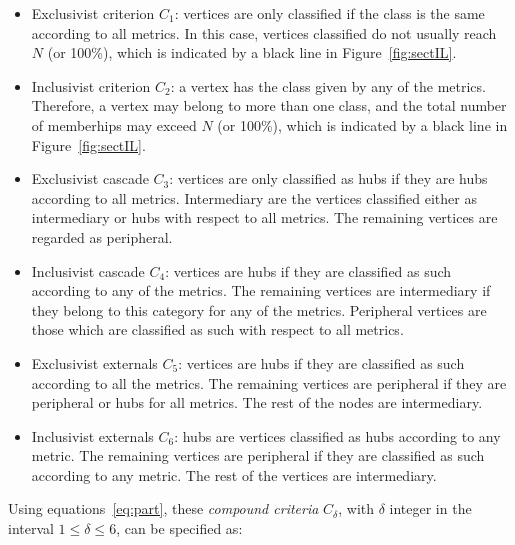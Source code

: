 \documentclass[%
	aip,
	jmp,%
	amsmath,amssymb,
	reprint,%
]{revtex4-1}
\begin{document}
\begin{itemize}
	\item Exclusivist criterion $C_1$:  vertices are only classified if the class is the same according to all metrics.
		In this case, vertices classified do not usually reach $N$ (or 100\%),
		which is indicated by a black line in Figure~\ref{fig:sectIL}.
	\item Inclusivist criterion $C_2$: a vertex has the class given by any of the metrics.
		Therefore, a vertex may belong to more than one class, and the total number of memberhips may exceed $N$ (or 100\%),
		which is indicated by a black line in Figure~\ref{fig:sectIL}.
	\item Exclusivist cascade $C_3$: vertices are only classified as hubs if they are hubs according to all metrics.
		Intermediary are the vertices classified either as intermediary or hubs with respect to all metrics.
		The remaining vertices are regarded as peripheral.
	\item Inclusivist cascade $C_4$: vertices are hubs if they are classified as such according to any of the metrics.
		The remaining vertices are intermediary if they belong to this category for any of the metrics.
		Peripheral vertices are those which are classified as such with respect to all metrics.
	\item Exclusivist externals $C_5$: vertices are hubs if they are classified as such according to all the metrics.
		The remaining vertices are peripheral if they are peripheral or hubs for all metrics.
		The rest of the nodes are intermediary.
	\item Inclusivist externals $C_6$: hubs are vertices classified as hubs according to any metric. The remaining vertices are peripheral if they are classified as such according to any metric. The rest of the vertices are intermediary.
\end{itemize}

Using equations~\ref{eq:part}, these \emph{compound criteria} $C_\delta$, with $\delta$ integer in the interval $1\leq\delta\leq6$, can be specified as:
\end{document}
